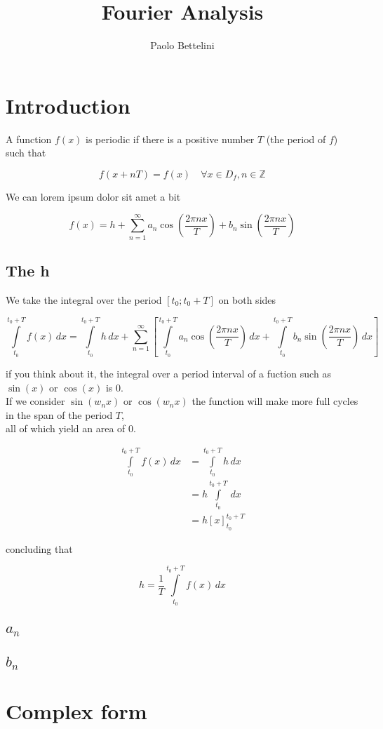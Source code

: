 \documentclass{article}
\title{Fourier Analysis}
\author{Paolo Bettelini}
\date{}
\newcommand{\integral}[4]{\int\limits_{#1}^{#2} #3\,d#4}
\begin{document}
\maketitle
\tableofcontents
\pagebreak

\section{Introduction}

A function \(f(x)\) is periodic if there is a positive number \(T\) (the period of \(f\)) such that

\[
    f(x + nT) = f(x)
    \quad \forall x \in D_f, n \in \mathbb{Z}
\]

We can lorem ipsum dolor sit amet a bit

\[
    f(x) = h + \sum_{n=1}^{\infty}
        a_n \cos\left(\frac{2\pi n x}{T}\right) +
        b_n \sin\left(\frac{2\pi n x}{T}\right)
\]

\subsection{The h}

We take the integral over the period \([t_0;t_0+T]\) on both sides

\[
    \integral{t_0}{t_0+T}{f(x)}{x} =
    \integral{t_0}{t_0+T}{h}{x} +
    \sum_{n=1}^{\infty}
    \left[
    \integral{t_0}{t_0+T}{a_n \cos\left(\frac{2\pi n x}{T}\right)}{x} +
    \integral{t_0}{t_0+T}{b_n \sin\left(\frac{2\pi n x}{T}\right)}{x}
    \right]
\]

if you think about it, the integral over a period interval of a fuction such as \(\sin(x)\) or \(\cos(x)\) is 0. \\
If we consider \(\sin(w_n x)\) or \(\cos(w_n x)\) the function will make more full cycles in the span of the period \(T\), \\
all of which yield an area of 0.

\begin{align*}
    \integral{t_0}{t_0+T}{f(x)}{x} &=
    \integral{t_0}{t_0+T}{h}{x} \\
    &= h \integral{t_0}{t_0+T}{}{x} \\
    &= h {\left[x\right]}^{t_0+T}_{t_0}
\end{align*}

concluding that

\[
    h = \frac{1}{T} \integral{t_0}{t_0+T}{f(x)}{x}
\]

\subsection{\(a_n\)}

\subsection{\(b_n\)}

\section{Complex form}

\pagebreak

\end{document}
